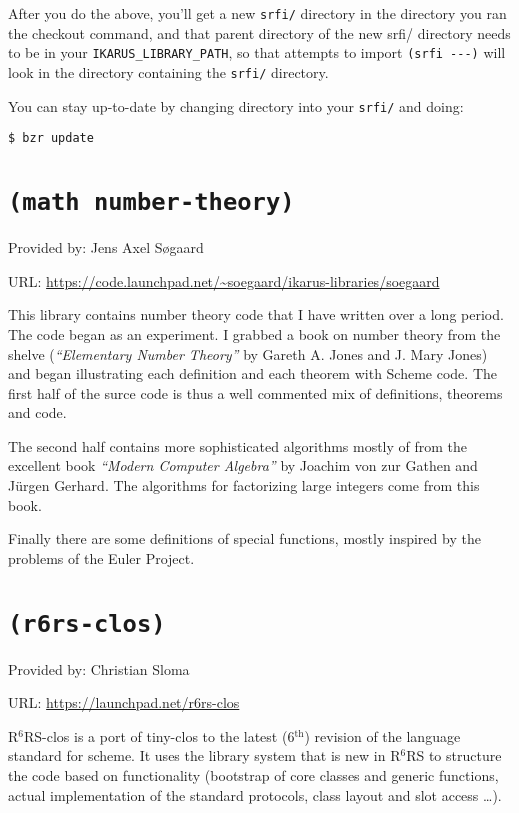 \documentclass[onecolumn, 12pt, twoside, openright, dvipdfm]{book}
\newcommand{\rnrs}[1]{R$^{\mathrm{#1}}$RS}
\begin{document}
After you do the above, you'll get a new \verb|srfi/| directory in the
directory you ran the checkout command, and that parent directory of the
new srfi/ directory needs to be in your
\verb|IKARUS_LIBRARY_PATH|, so that
attempts to import \verb|(srfi ---)| will look in the directory containing the
\verb|srfi/| directory.

You can stay up-to-date by changing directory into your
\verb|srfi/| and doing:
\begin{verbatim}
$ bzr update
\end{verbatim}


\newpage
\section{\texttt{(math number-theory)}}
Provided by: Jens Axel Søgaard

URL: \url{https://code.launchpad.net/~soegaard/ikarus-libraries/soegaard}


This library contains number theory code that I have written
over a long period. The code began as an experiment.  I
grabbed a book on number theory from the shelve (\emph{``Elementary
Number Theory''} by Gareth A. Jones and J. Mary Jones) and began
illustrating each definition and each theorem with Scheme
code. The first half of the surce code is thus a well
commented mix of definitions, theorems and code.

The second half contains more sophisticated algorithms mostly
of from the excellent book \emph{``Modern Computer Algebra''} by
Joachim von zur Gathen and Jürgen Gerhard. The algorithms for
factorizing large integers come from this book.

Finally there are some definitions of special functions,
mostly inspired by the problems of the Euler Project.

\newpage
\section{\texttt{(r6rs-clos)}}
Provided by: Christian Sloma

URL: \url{https://launchpad.net/r6rs-clos}


\rnrs{6}-clos is a port of tiny-clos to the latest
(6$^{\mathrm{th}}$) revision of the language standard for scheme. It
uses the library system that is new in \rnrs{6} to structure the
code based on functionality (bootstrap of core classes and generic
functions, actual implementation of the standard protocols, class
layout and slot access \ldots).
\end{document}
